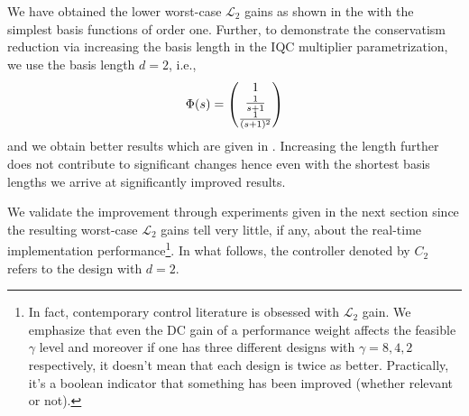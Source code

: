 We have obtained the lower worst-case $\mathcal{L}_2$ gains as shown in the  with the simplest basis functions
of order one. Further, to demonstrate the conservatism reduction via increasing the basis length in the IQC multiplier parametrization,
 we use the basis length $d=2$, i.e.,
\[
\Phi(s) = \begin{pmatrix}1\\\frac{1}{s+1}\\\frac{1}{(s+1)^2}\end{pmatrix}
\]
and we obtain better results which are given in . Increasing the length further does not contribute to 
significant changes hence even with the shortest basis lengths we arrive at significantly improved results. 

We validate the improvement through experiments given in the next section since the resulting worst-case $\mathcal{L}_2$ gains 
tell very little, if any, about the real-time implementation performance\footnote{In fact, contemporary control literature is obsessed 
with $\mathcal{L}_2$ gain. We emphasize that even the DC gain of a performance weight affects the feasible $\gamma$ level and 
moreover if one has three different designs with $\gamma=8,4,2$ respectively, it doesn't mean that each design is twice as better. 
Practically, it's a boolean indicator that something has been improved (whether relevant or not).}. In what 
follows, the controller denoted by $C_2$ refers to the design with $d=2$.


\designtwodataone

\designtwodatadtwo


